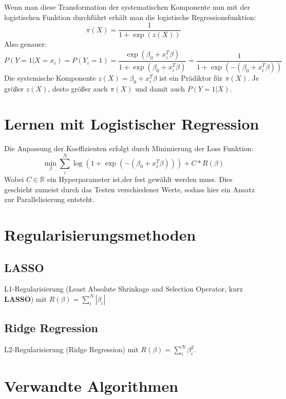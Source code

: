 \newpage
Wenn man diese Transformation der systematischen Komponente nun mit der logistischen Funktion durchführt erhält man die logistische Regressionsfunktion:
\begin{displaymath}
\pi(X)= \dfrac{1}{1+\exp(z(X))}
\end{displaymath}
Also genauer:
\begin{displaymath}
P(Y=1 | X=x_i)=P(Y_i=1)=\frac{\exp(\beta_0+x_i^T\beta)}{1+\exp(\beta_0+x_i^T\beta)} = \frac{1}{1+\exp(-(\beta_0+x_i^T\beta))}
\end{displaymath}
Die systemische Komponente $z(X)=\beta_0 + x_i^T\beta$ ist ein Prädiktor für $\pi(X)$. Je größer $z(X)$, desto größer auch $\pi(X)$ und damit auch $P(Y=1|X)$.\cite{BECK} 
\section{Lernen mit Logistischer Regression}
Die Anpassung der Koeffizienten erfolgt durch Minimierung der Loss Funktion: \begin{displaymath}
\min_\beta \sum_{i}^N \log(1+\exp(-(\beta_0+x_i^T\beta))) +C*R(\beta)
\end{displaymath}
Wobei $C \in \mathbb R$ ein Hyperparameter ist,der fest gewählt werden muss. Dies geschieht zumeist durch das Testen verschiedener Werte, sodass hier ein Ansatz zur Parallelisierung entsteht.
\section{Regularisierungsmethoden}
\subsection{LASSO}
L1-Regularisierung (Least Absolute Shrinkage and Selection Operator, kurz \textbf{LASSO}) mit $R(\beta) = \sum_{i}^N|\beta_i|$
\subsection{Ridge Regression}
L2-Regularisierung (Ridge Regression) mit $R(\beta)= \sum_{i}^N \beta_i^2$.
\section{Verwandte Algorithmen}